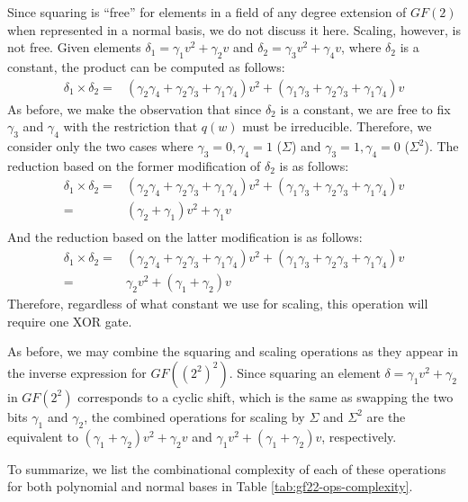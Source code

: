 Since squaring is ``free'' for elements in a field of any degree extension of $GF(2)$ when represented in a normal basis, we do not discuss it here. Scaling, however, is not free. Given elements $\delta_1 = \gamma_1 v^2 + \gamma_2 v$ and $\delta_2 = \gamma_3 v^2 + \gamma_4 v$, where $\delta_2$ is a constant, the product can be computed as follows:
\begin{align*}
\delta_1 \times \delta_2 = & (\gamma_2\gamma_4 + \gamma_2\gamma_3 + \gamma_1\gamma_4)v^2 + (\gamma_1\gamma_3 + \gamma_2\gamma_3 + \gamma_1\gamma_4)v
\end{align*}
As before, we make the observation that since $\delta_2$ is a constant, we are free to fix $\gamma_3$ and $\gamma_4$ with the restriction that $q(w)$ must be irreducible. Therefore, we consider only the two cases where $\gamma_3 = 0, \gamma_4 = 1$ ($\Sigma$) and $\gamma_3 = 1, \gamma_4 = 0$ ($\Sigma^2$). The reduction based on the former modification of $\delta_2$ is as follows:
\begin{align*}
\delta_1 \times \delta_2 = & (\gamma_2\gamma_4 + \gamma_2\gamma_3 + \gamma_1\gamma_4)v^2 + (\gamma_1\gamma_3 + \gamma_2\gamma_3 + \gamma_1\gamma_4)v \\
= & (\gamma_2 + \gamma_1)v^2 + \gamma_1 v \\
\end{align*}
And the reduction based on the latter modification is as follows:
\begin{align*}
\delta_1 \times \delta_2 = & (\gamma_2\gamma_4 + \gamma_2\gamma_3 + \gamma_1\gamma_4)v^2 + (\gamma_1\gamma_3 + \gamma_2\gamma_3 + \gamma_1\gamma_4)v \\
= & \gamma_2 v^2 + (\gamma_1 + \gamma_2)v 
\end{align*}
Therefore, regardless of what constant we use for scaling, this operation will require one XOR gate. 

As before, we may combine the squaring and scaling operations as they appear in the inverse expression for $GF((2^2)^2)$. Since squaring an element $\delta = \gamma_1 v^2 + \gamma_2$ in $GF(2^2)$ corresponds to a cyclic shift, which is the same as swapping the two bits $\gamma_1$ and $\gamma_2$, the combined operations for scaling by $\Sigma$ and $\Sigma^2$ are the equivalent to $(\gamma_1 + \gamma_2)v^2 + \gamma_2 v$ and $\gamma_1 v^2 + (\gamma_1 + \gamma_2)v$, respectively.

To summarize, we list the combinational complexity of each of these operations for both polynomial and normal bases in Table \ref{tab:gf22-ops-complexity}.

